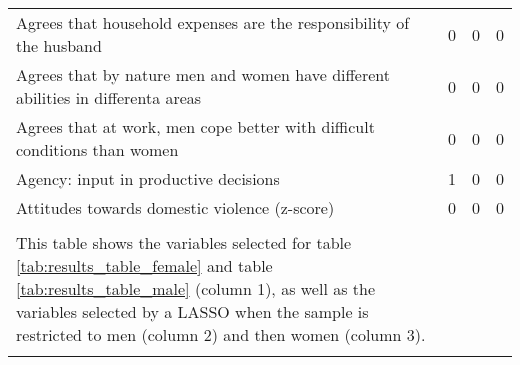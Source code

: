 \begin{longtable}{m{9cm}ccc}
Agrees that household expenses are the responsibility of the husband&0&0&0\\
Agrees that by nature men and women have different abilities in differenta areas&0&0&0\\
Agrees that at work, men cope better with difficult conditions than women&0&0&0\\
Agency: input in productive decisions&1&0&0\\
Attitudes towards domestic violence (z-score)&0&0&0\\
\midrule
\begin{minipage}{13cm}
\small{
{\textit Notes:} \\
This table shows the variables selected for table \ref{tab:results_table_female} and table \ref{tab:results_table_male} (column 1), as well as the variables selected by a LASSO when the sample is restricted to men (column 2) and then women (column 3). \\
}
\end{minipage} \\* \bottomrule
\end{longtable}
